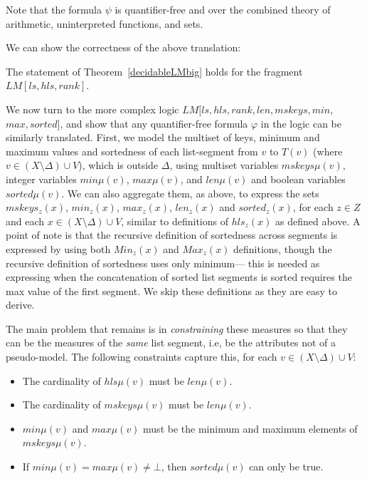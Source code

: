 Note that the formula $\psi$ is quantifier-free and over the combined theory of arithmetic, uninterpreted functions, and sets.

We can show the correctness of the above translation:
\begin{theorem}
The statement of Theorem~\ref{decidableLMbig} holds for the fragment $LM[ls,hls,rank]$.
\end{theorem}

We now turn to the more complex logic $LM[ls, hls, rank, len, mskeys, min, $\\$max, sorted]$, and show that
any quantifier-free formula $\varphi$ in the logic can be similarly translated. First, we model the multiset
of keys, minimum and maximum values and sortedness of each list-segment from $v$ to $T(v)$ 
(where $v \in (X \setminus \Delta) \cup V$),
which is outside $\Delta$, using multiset variables $mskeys\mu(v)$, integer variables $min\mu(v)$, $max\mu(v)$,
and $len\mu(v)$ and boolean variables $sorted\mu(v)$.
We can also aggregate them, as above, to express the sets $mskeys_z(x)$, $min_z(x)$, $max_z(x)$, $len_z(x)$
and $sorted_z(x)$, for each $z \in Z$ and
each $x \in (X \setminus \Delta) \cup V$, similar to definitions of $hls_z(x)$ as defined above.
A point of note is that the recursive definition of sortedness across segments is expressed
by using both $Min_z(x)$ and $Max_z(x)$ definitions, though the recursive definition of sortedness uses 
only minimum--- this is needed as expressing when the concatenation of sorted list segments is sorted
requires the max value of the first segment. We skip these definitions as they are easy to derive.

The main problem that remains is in \emph{constraining} these measures so that they can be the measures
of the \emph{same} list segment, i.e, be the attributes not of a pseudo-model. The following constraints capture this, for each 
$v \in (X \setminus \Delta) \cup V$:
\begin{itemize}
	\item The cardinality of $hls\mu(v)$ must be $len\mu(v)$.
	\item The cardinality of $mskeys\mu(v)$ must be $len\mu(v)$.
	\item $min\mu(v)$ and $max\mu(v)$ must be the minimum and maximum elements of $mskeys\mu(v)$.
	\item If $min\mu(v)=max\mu(v) \not = \bot$, then $sorted\mu(v)$ can only be true.
\end{itemize}

